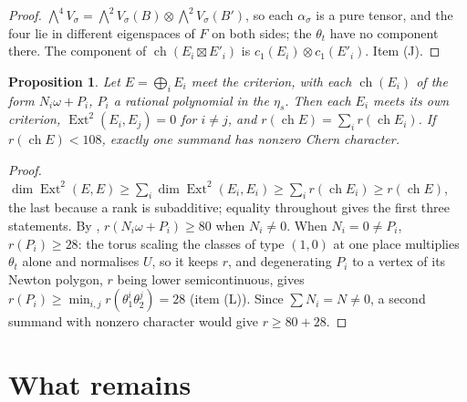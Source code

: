 \documentclass[11pt]{amsart}
\newtheorem{proposition}[theorem]{Proposition}
\theoremstyle{definition}
\theoremstyle{remark}
\newcommand{\ch}{\operatorname{ch}}
\newcommand{\Ext}{\operatorname{Ext}}
\begin{document}
\begin{proof}
$\bigwedge^{4}V_{\sigma}=\bigwedge^{2}V_{\sigma}(B)\otimes
\bigwedge^{2}V_{\sigma}(B')$, so each $\alpha_{\sigma}$ is a pure tensor, and
the four lie in different eigenspaces of $F$ on both sides; the
$\theta_{t}$ have no component there. The component of
$\ch(E_{i}\boxtimes E'_{i})$ is $c_{1}(E_{i})\otimes c_{1}(E'_{i})$. Item
(J).
\end{proof}

\begin{proposition}\label{prop:sums}
Let $E=\bigoplus_{i}E_{i}$ meet the criterion, with each $\ch(E_{i})$ of the
form $N_{i}\omega+P_{i}$, $P_{i}$ a rational polynomial in the $\eta_{s}$.
Then each $E_{i}$ meets its own criterion, $\Ext^{2}(E_{i},E_{j})=0$ for
$i\neq j$, and $r(\ch E)=\sum_{i}r(\ch E_{i})$. If $r(\ch E)<108$, exactly one
summand has nonzero Chern character.
\end{proposition}

\begin{proof}
$\dim\Ext^{2}(E,E)\ge\sum_{i}\dim\Ext^{2}(E_{i},E_{i})\ge\sum_{i}
r(\ch E_{i})\ge r(\ch E)$, the last because a rank is subadditive; equality
throughout gives the first three statements. By
\cite[Theorem~19.21(iii)]{BMB}, $r(N_{i}\omega+P_{i})\ge80$ when
$N_{i}\neq0$. When $N_{i}=0\neq P_{i}$, $r(P_{i})\ge28$: the torus scaling
the classes of type $(1,0)$ at one place multiplies $\theta_{t}$ alone and
normalises $U$, so it keeps $r$, and degenerating $P_{i}$ to a vertex of its
Newton polygon, $r$ being lower semicontinuous, gives
$r(P_{i})\ge\min_{i,j}r(\theta_{1}^{i}\theta_{2}^{j})=28$ (item (L)).
Since $\sum N_{i}=N\neq0$, a second summand with nonzero character would give
$r\ge80+28$.
\end{proof}

\section{What remains}\label{sec:remains}
\end{document}

